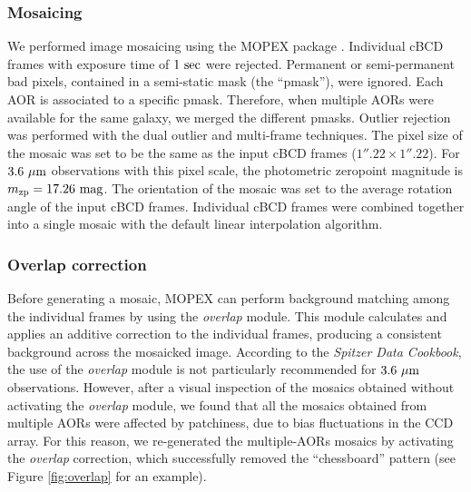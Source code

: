 \documentclass[preprint2]{emulateapj}
\begin{document}
\subsubsection{Mosaicing}
We performed image mosaicing using the %
MOPEX package \citep{makovozmarleau2005mopex}.
Individual cBCD frames with exposure time of $1~\rm sec$ were rejected.
Permanent or semi-permanent bad pixels, contained in a semi-static mask (the ``pmask''), were ignored.
Each AOR is associated to a specific pmask. 
Therefore, when multiple AORs were available for the same galaxy, 
we merged the different pmasks. 
Outlier rejection was performed with the dual outlier and multi-frame techniques.
The pixel size of the mosaic was set to be the same as the input cBCD frames ($1''.22 \times 1''.22$).
For $3.6~\rm \mu m$ observations with this pixel scale, 
the photometric zeropoint magnitude is $m_{\rm zp} = 17.26 \rm~mag$.
The orientation of the mosaic was set to the average rotation angle of the input cBCD frames. 
Individual cBCD frames were combined together into a single mosaic with the default linear interpolation algorithm.

\subsubsection{Overlap correction}
Before generating a mosaic, MOPEX can perform background matching among the individual frames
by using the \emph{overlap} module. 
This module calculates and applies an additive correction to the individual frames,
producing a consistent background across the mosaicked image.
According to the \emph{Spitzer Data Cookbook}, the use of the \emph{overlap} module is not particularly recommended for 
$3.6~\rm \mu m$ observations. 
However, after a visual inspection of the mosaics obtained without activating the \emph{overlap} module,
we found that all the mosaics obtained from multiple AORs were affected by patchiness, 
due to bias fluctuations in the CCD array.
For this reason, we re-generated the multiple-AORs mosaics by activating the \emph{overlap} correction,
which successfully removed the ``chessboard'' pattern (see Figure \ref{fig:overlap} for an example).
\end{document}
